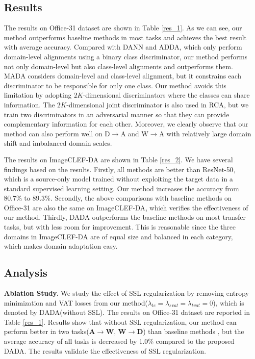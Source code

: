 \documentclass{ecai}
\begin{document}
\subsection{Results}
The results on Office-31 dataset are shown in Table \ref{res_1}. As we can see, our method outperforms baseline methods in most tasks and achieves the best result with average accuracy. Compared with DANN and ADDA, which only perform domain-level alignments using a binary class discriminator, our method performs not only domain-level but also class-level alignments and outperforms them. MADA considers domain-level and class-level alignment, but it constrains each discriminator to be responsible for only one class. Our method avoids this limitation by adopting  $2K$-dimensional discriminators where the classes can share information. The $2K$-dimensional joint discriminator is also used in RCA, but we train two discriminators in an adversarial manner so that they can provide  complementary information for each other. Moreover, we clearly observe that our method can also perform well on D$\rightarrow$A and  W$\rightarrow$A with relatively large domain shift and imbalanced domain scales.

The results on ImageCLEF-DA are shown in Table \ref{res_2}. We have several findings based on the results. Firstly, all methods are better than ResNet-50, which is a source-only model trained without exploiting the target data in a standard supervised learning setting. Our method increases the accuracy from 80.7\% to 89.3\%. Secondly, the above comparisons with baseline methods on Office-31 are also the same on ImageCLEF-DA, which verifies the effectiveness of our method. Thirdly, DADA outperforms the baseline methods on most transfer tasks, but with less room for improvement. This is reasonable since the three domains in ImageCLEF-DA are of equal size and balanced in each category, which makes domain adaptation easy.

\subsection{Analysis}

\textbf{Ablation Study.} We study the effect of SSL  regularization by removing entropy minimization and VAT losses from our method($\lambda_{te} = \lambda_{svat} = \lambda_{tvat} = 0$), which is denoted by DADA(without  SSL). The results on Office-31 dataset are reported in Table \ref{res_1}.  Results show that without SSL regularization, our method can perform  better in two tasks(\textbf{A}$\rightarrow$\textbf{W}, \textbf{W}$\rightarrow$\textbf{D}) than baseline methods , but the average accuracy of all tasks is decreased by 1.0\% compared to the proposed DADA. The results validate the effectiveness of SSL regularization.
\end{document}

